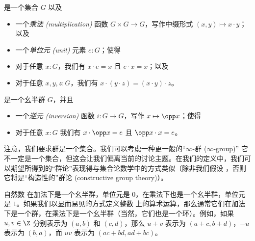 \begin{defn}
  是一个集合 $G$ 以及
  \begin{itemize}
    \item 一个\emph{乘法 (multiplication)}
    函数 $G\times G\to G$，写作中缀形式 $(x,y) \mapsto x\cdot y$；以及
    \item 一个\emph{单位元 (unit)}
    元素 $e:G$；使得
    \item 对于任意 $x:G$，我们有 $x\cdot e = x$ 且 $e\cdot x = x$；以及
    \item 对于任意 $x,y,z:G$，我们有 $x\cdot (y\cdot z) = (x\cdot y)\cdot z$。
  \end{itemize}
  是一个幺半群 $G$，并且
  \begin{itemize}
    \item 一个\emph{逆元 (inversion)} 函数 $i:G\to G$，写作 $x\mapsto \opp x$；使得
    \item 对于任意 $x:G$ 我们有 $x\cdot \opp x = e$ 且 $\opp x \cdot x = e$。
  \end{itemize}
\end{defn}

\begin{rmk}\label{rmk:infty-group}
注意，我们要求群是一个集合。我们可以考虑一种更一般的“$\infty$-群 ($\infty$-group)”%
它不一定是一个集合，但这会让我们偏离当前的讨论主题。在我们的定义中，我们可以期望所得到的“群论”表现得与集合论数学中的方式类似（除非我们假设 \LEM{}，否则它将是“构造性的”群论 (constructive group theory)）。
\end{rmk}

\begin{eg}
  自然数 \N 在加法下是一个幺半群，单位元是 $0$，在乘法下也是一个幺半群，单位元是 $1$。如果我们以显而易见的方式定义整数 \Z 上的算术运算，那么通常它们在加法下是一个群，在乘法下是一个幺半群（当然，它们也是一个环）。例如，如果 $u, v \in \Z$ 分别表示为 $(a,b)$ 和 $(c,d)$，那么 $u + v$ 表示为 $(a + c, b + d)$，$-u$ 表示为 $(b, a)$，而 $u v$ 表示为 $(a c + b d, a d + b c)$。
\end{eg}

